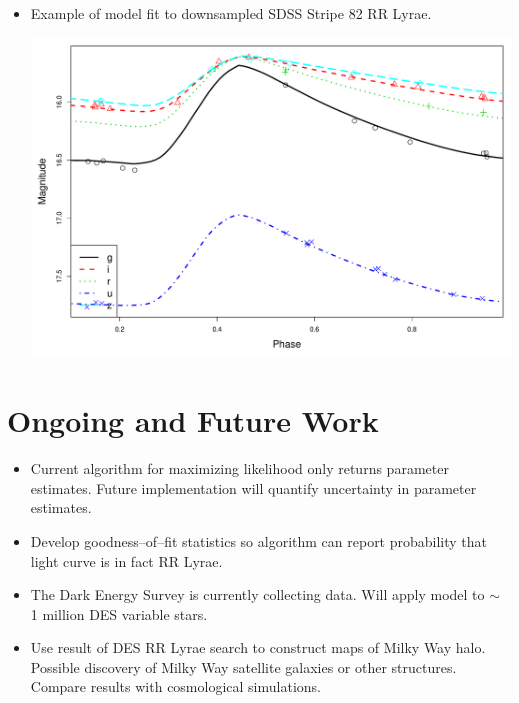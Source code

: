 \documentclass[a0,portrait]{a0poster}
\begin{document}
\begin{multicols}{2}
\begin{itemize}
\item Example of model fit to downsampled SDSS Stripe 82 RR Lyrae.

\begin{center}\vspace{1cm}
\includegraphics[width=0.7\linewidth]{2_one.pdf}
\end{center}\vspace{1cm}



\end{itemize}

\section*{Ongoing and Future Work}

\begin{itemize}
\item Current algorithm for maximizing likelihood only returns parameter estimates. Future implementation will quantify uncertainty in parameter estimates.
\item Develop goodness--of--fit statistics so algorithm can report probability that light curve is in fact RR Lyrae.
\item The Dark Energy Survey is currently collecting data. Will apply model to $\sim$ 1 million DES variable stars.
\item Use result of DES RR Lyrae search to construct maps of Milky Way halo. Possible discovery of Milky Way satellite galaxies or other structures. Compare results with cosmological simulations.
\end{itemize}






\nocite{*} %


\end{multicols}
\end{document}
